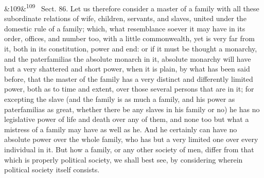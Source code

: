 \documentclass[12pt]{article}
\newcommand{\para}[1][]{\par\noindent\ifx&#1&\else\textsuperscript{\footnotesize #1}~\fi}
\begin{document}
\para[109] Sect. 86. Let us therefore consider a master of a family with all these subordinate relations of wife, children, servants, and slaves, united under the domestic rule of a family; which, what resemblance soever it may have in its order, offices, and number too, with a little commonwealth, yet is very far from it, both in its constitution, power and end: or if it must be thought a monarchy, and the paterfamilias the absolute monarch in it, absolute monarchy will have but a very shattered and short power, when it is plain, by what has been said before, that the master of the family has a very distinct and differently limited power, both as to time and extent, over those several persons that are in it; for excepting the slave (and the family is as much a family, and his power as paterfamilias as great, whether there be any slaves in his family or no) he has no legislative power of life and death over any of them, and none too but what a mistress of a family may have as well as he. And he certainly can have no absolute power over the whole family, who has but a very limited one over every individual in it. But how a family, or any other society of men, differ from that which is properly political society, we shall best see, by considering wherein political society itself consists.
\end{document}
